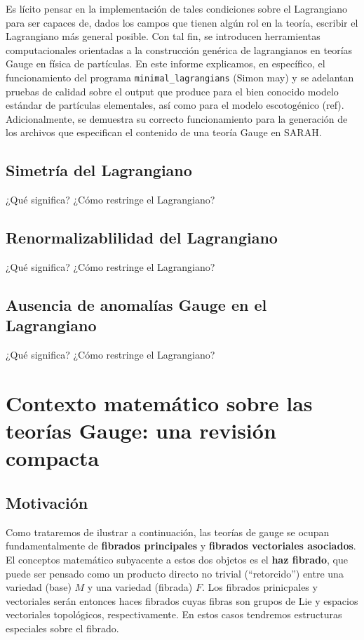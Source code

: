 \documentclass[
                egregdoesnotlikesansseriftitles,
                paper=a4,
                fontsize=13pt,
                DIV=calc]{scrarticle}
\begin{document}
Es lícito pensar en la implementación de tales condiciones sobre el Lagrangiano
para ser capaces de, dados los campos que tienen algún rol en la teoría,
escribir el Lagrangiano más general posible. Con tal fin, se introducen
herramientas computacionales orientadas a la construcción genérica de
lagrangianos en teorías Gauge en física de partículas. En este informe
explicamos, en específico, el funcionamiento del programa \texttt{minimal\_lagrangians}
(Simon may) y se adelantan pruebas de calidad sobre el output que produce para
el bien conocido modelo estándar de partículas elementales, así como para el
modelo escotogénico (ref). Adicionalmente, se demuestra su correcto
funcionamiento para la generación de los archivos que especifican el contenido
de una teoría Gauge en SARAH.

\subsection{Simetría del Lagrangiano}
\label{sec:orgdbcfdb1}
¿Qué significa? ¿Cómo restringe el Lagrangiano?

\subsection{Renormalizablilidad del Lagrangiano}
\label{sec:org2dbd824}
¿Qué significa? ¿Cómo restringe el Lagrangiano?

\subsection{Ausencia de anomalías Gauge en el Lagrangiano}
\label{sec:org86e9f32}
¿Qué significa? ¿Cómo restringe el Lagrangiano?

\section{Contexto matemático sobre las teorías Gauge: una revisión compacta}
\label{sec:orgc3ac83c}

\subsection{Motivación}
\label{sec:org0828073}
Como trataremos de ilustrar a continuación, las teorías de gauge se ocupan
fundamentalmente de \textbf{fibrados principales} y \textbf{fibrados vectoriales asociados}.
El conceptos matemático subyacente a estos dos objetos es el \textbf{haz fibrado}, que
puede ser pensado como un producto directo no trivial (``retorcido'') entre una
variedad (base) \(M\) y una variedad (fibrada) \(F\). Los fibrados prinicpales y
vectoriales serán entonces haces fibrados cuyas fibras son grupos de Lie y
espacios vectoriales topológicos, respectivamente. En estos casos tendremos
estructuras especiales sobre el fibrado.
\end{document}
